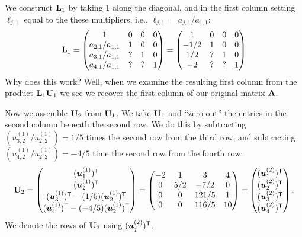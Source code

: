 We construct $\mathbf{L}_{1}$ by taking $1$ along the diagonal, and in the
first column setting $\ell_{j,1}$ equal to the these multipliers, i.e.,
$\ell_{j,1}=a_{j,1}/a_{1,1}$:
\begin{equation}
\mathbf{L}_{1} = \begin{pmatrix}
             1 & 0 & 0 & 0 \\
a_{2,1}/a_{1,1} & 1 & 0 & 0\\
a_{3,1}/a_{1,1} & ? & 1 & 0\\
a_{4,1}/a_{1,1} & ? & ? & 1
\end{pmatrix}= \begin{pmatrix}
             1 & 0 & 0 & 0 \\
-1/2 & 1 & 0 & 0\\
1/2 & ? & 1 & 0\\
-2 & ? & ? & 1
\end{pmatrix}
\end{equation}
Why does this work? Well, when we examine the resulting first column
from the product $\mathbf{L}_{1}\mathbf{U}_{1}$ we see we recover the first
column of our original matrix $\mathbf{A}$. 

 Now we assemble $\mathbf{U}_{2}$ from $\mathbf{U}_{1}$.
We take $\mathbf{U}_{1}$ and ``zero out'' the entries in the second column
beneath the second row. We do this by subtracting
$(u^{(1)}_{3,2}/u^{(1)}_{2,2})=1/5$ times the second row from the third row,
and subtracting
$(u^{(1)}_{4,2}/u^{(1)}_{2,2})=-4/5$ time the second row from the fourth
row:
\begin{equation}
\mathbf{U}_{2} = \begin{pmatrix}(\boldsymbol{u}^{(1)}_{1})^{\mathsf{T}}\\
  (\boldsymbol{u}^{(1)}_{2})^{\mathsf{T}}\\
  (\boldsymbol{u}^{(1)}_{3})^{\mathsf{T}} - (1/5)(\boldsymbol{u}^{(1)}_{2})^{\mathsf{T}}\\
  (\boldsymbol{u}^{(1)}_{4})^{\mathsf{T}} - (-4/5)(\boldsymbol{u}^{(1)}_{2})^{\mathsf{T}}
\end{pmatrix}
=\begin{pmatrix}
    -2 &  1  &     3 &  4 \\
     0 & 5/2 &  -7/2 &  0\\
     0 &  0  & 121/5 & 1\\
     0 &  0  & 116/5 & 10
\end{pmatrix} = \begin{pmatrix}(\boldsymbol{u}^{(2)}_{1})^{\mathsf{T}}\\
  (\boldsymbol{u}^{(2)}_{2})^{\mathsf{T}}\\
  (\boldsymbol{u}^{(2)}_{3})^{\mathsf{T}}\\
  (\boldsymbol{u}^{(2)}_{4})^{\mathsf{T}}
\end{pmatrix}.
\end{equation}
We denote the rows of $\mathbf{U}_{2}$ using $(\boldsymbol{u}^{(2)}_{j})^{\mathsf{T}}$.

